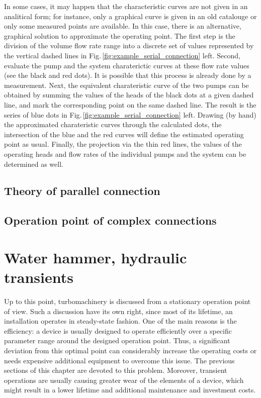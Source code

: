 In some cases, it may happen that the characteristic curves are not given in an analitical form; for instance, only a graphical curve is given in an old catalouge or only some measured points are available. In this case, there is an alternative, graphical solution to approximate the operating point. The first step is the division of the volume flow rate range into a discrete set of values represented by the vertical dashed lines in Fig.\,\ref{fig:example_serial_connection} left. Second, evaluate the pump and the system charaterictic curves at these flow rate values (see the black and red dots). It is possible that this process is already done by a measurement. Next, the equivalent charateristic curve of the two pumps can be obtained by summing the values of the heads of the black dots at a given dashed line, and mark the corresponding point on the same dashed line. The result is the series of blue dots in Fig.\,\ref{fig:example_serial_connection} left. Drawing (by hand) the approximated charateristic curves through the calculated dots, the intersection of the blue and the red curves will define the estimated operating point as usual. Finally, the projection via the thin red lines, the values of the operating heads and flow rates of the individual pumps and the system can be determined as well.







\subsection{Theory of parallel connection}

\subsection{Operation point of complex connections}



\section{Water hammer, hydraulic transients}

Up to this point, turbomachinery is discussed from a stationary operation point of view. Such a discussion have its own right, since most of its lifetime, an installation operates in steady-state fashion. One of the main reasons is the efficiency: a device is usually designed to operate efficiently over a specific parameter range around the designed operation point. Thus, a significant deviation from this optimal point can considerably increase the operating costs or needs expensive additional equipment to overcome this issue. The previous sections of this chapter are devoted to this problem. Moreover, transient operations are usually causing greater wear of the elements of a device, which might result in a lower lifetime and additional maintenance and investment costs.

